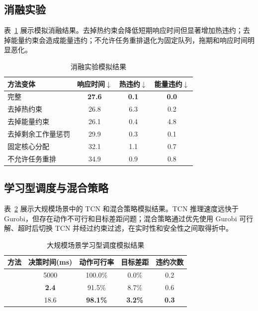 \subsection{消融实验}

表~\ref{tab:ablation} 展示模拟消融结果。去掉热约束会降低短期响应时间但显著增加热违约；去掉能量约束会造成能量违约；不允许任务重排退化为固定队列，拖期和响应时间明显恶化。

\begin{table}[t]
\centering
\caption{消融实验模拟结果}
\label{tab:ablation}
\begin{tabular}{lccc}
\toprule
方法变体 & 响应时间$\downarrow$ & 热违约$\downarrow$ & 能量违约$\downarrow$ \\
\midrule
完整 \rhcfull{} & \textbf{27.6} & \textbf{0.1} & \textbf{0.0} \\
去掉热约束 & 26.8 & 6.3 & 0.2 \\
去掉能量约束 & 26.1 & 0.4 & 4.8 \\
去掉剩余工作量惩罚 & 29.9 & 0.3 & 0.1 \\
固定核心分配 & 32.1 & 1.1 & 0.7 \\
不允许任务重排 & 34.9 & 0.9 & 0.8 \\
\bottomrule
\end{tabular}
\end{table}

\subsection{学习型调度与混合策略}

表~\ref{tab:tcn} 展示大规模场景中的 TCN 和混合策略模拟结果。TCN 推理速度远快于 Gurobi，但存在动作不可行和目标差距问题；混合策略通过优先使用 Gurobi 可行解、超时后切换 TCN 并经过约束过滤，在实时性和安全性之间取得折中。

\begin{table}[t]
\centering
\caption{大规模场景学习型调度模拟结果}
\label{tab:tcn}
\begin{tabular}{lcccc}
\toprule
方法 & 决策时间(ms) & 动作可行率 & 目标差距 & 违约次数 \\
\midrule
\rhcfull{} & 5000 & 100.0\% & 0.0\% & 0.2 \\
\tcns{} & \textbf{2.4} & 91.5\% & 8.7\% & 0.6 \\
\hybrid{} & 18.6 & \textbf{98.1\%} & \textbf{3.2\%} & \textbf{0.3} \\
\bottomrule
\end{tabular}
\end{table}

